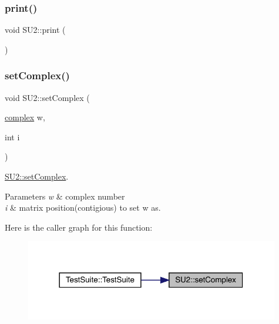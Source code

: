 \mbox{\label{class_s_u2_a1210d531ef84574deb5f03dd24de80cf}} 
\subsubsection{\texorpdfstring{print()}{print()}}
{\footnotesize\ttfamily void S\+U2\+::print (\begin{DoxyParamCaption}{ }\end{DoxyParamCaption})}

\mbox{\label{class_s_u2_afe1d093aaf7325c1a7490f84e4c59b12}} 
\subsubsection{\texorpdfstring{setComplex()}{setComplex()}}
{\footnotesize\ttfamily void S\+U2\+::set\+Complex (\begin{DoxyParamCaption}\item[{\mbox{\hyperlink{classcomplex}{complex}}}]{w,  }\item[{int}]{i }\end{DoxyParamCaption})}



\mbox{\hyperlink{class_s_u2_afe1d093aaf7325c1a7490f84e4c59b12}{S\+U2\+::set\+Complex}}. 


\begin{DoxyParams}{Parameters}
{\em w} & complex number \\
\hline
{\em i} & matrix position(contigious) to set w as. \\
\hline
\end{DoxyParams}
Here is the caller graph for this function\+:\nopagebreak
\begin{figure}[H]
\begin{center}
\leavevmode
\includegraphics[width=314pt]{class_s_u2_afe1d093aaf7325c1a7490f84e4c59b12_icgraph}
\end{center}
\end{figure}
\mbox{\label{class_s_u2_a798389d4b2bc24cea6a466473004e3f8}} 
